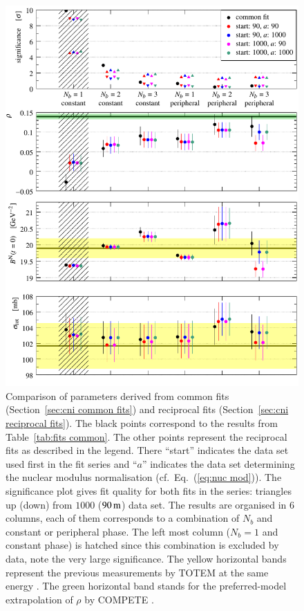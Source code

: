 \begin{figure}
\vskip-2mm
\begin{center}
\includegraphics{fig/fits_reciprocal_derived.pdf}
\vskip-5mm
\caption{%
Comparison of parameters derived from common fits (Section~\ref{sec:cni common fits}) and reciprocal fits (Section~\ref{sec:cni reciprocal fits}). The black points correspond to the results from Table~\ref{tab:fits common}. The other points represent the reciprocal fits as described in the legend. There ``start'' indicates the data set used first in the fit series and ``$a$'' indicates the data set determining the nuclear modulus normalisation (cf.~Eq.~(\ref{eq:nuc mod})). The significance plot gives fit quality for both fits in the series: triangles up (down) from $1000$ ($90\,{\rm m}$) data set. The results are organised in 6 columns, each of them corresponds to a combination of $N_b$ and constant or peripheral phase. The left most column ($N_b = 1$ and constant phase) is hatched since this combination is excluded by data, note the very large significance. The yellow horizontal bands represent the previous measurements by TOTEM at the same energy \cite{prl111}. The green horizontal band stands for the preferred-model extrapolation of $\rho$ by COMPETE \cite{compete}.
}
\label{fig:fits reciprocal der}
\end{center}
\end{figure}

